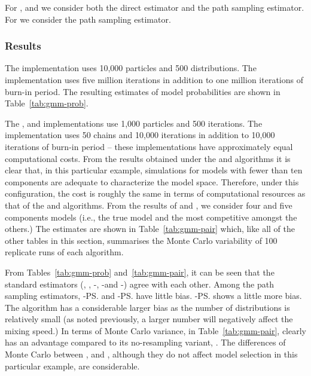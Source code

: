 For \smc[2], \smc[3] and \ais we consider both the direct estimator and the
path sampling estimator. For \pmcmc we consider the path sampling estimator.

\subsubsection{Results}
\label{sec:gmm_res}

The \smc[1] implementation uses 10,000 particles and 500 distributions. The
\rjmcmc implementation uses five million iterations in addition to one million
iterations of burn-in period. The resulting estimates of model probabilities
are shown in Table~\ref{tab:gmm-prob}.

The \smc[2], \smc[3] and \ais implementations use 1,000 particles and 500
iterations. The \pmcmc implementation uses 50 chains and 10,000 iterations in
addition to 10,000 iterations of burn-in period -- these implementations have
approximately equal computational costs. From the results obtained under the
\smc[1] and \rjmcmc algorithms it is clear that, in this particular example,
simulations for models with fewer than ten components are adequate to
characterize the model space. Therefore, under this configuration, the cost is
roughly the same in terms of computational resources as that of the \smc[1]
and \rjmcmc algorithms. From the results of \rjmcmc and \smc[1], we consider
four and five components models (i.e., the true model and the most competitive
amongst the others.) The estimates are shown in Table~\ref{tab:gmm-pair}
which, like all of the other tables in this section, summarises the Monte
Carlo variability of 100 replicate runs of each algorithm.




From Tables~\ref{tab:gmm-prob} and~\ref{tab:gmm-pair}, it can be seen that the
standard estimators (\rjmcmc, \smc[1], \smc[2]-\ds, \smc[3]-\ds and \ais-\ds)
agree with each other. Among the path sampling estimators, \smc[2]-\ps and
\ais-\ps have little bias. \smc[3]-\ps shows a little more bias. The \pmcmc
algorithm has a considerable larger bias as the number of distributions is
relatively small (as noted previously, a larger number will negatively affect
the mixing speed.) In terms of Monte Carlo variance, in
Table~\ref{tab:gmm-pair}, \smc[2] clearly has an advantage compared to its
no-resampling variant, \ais. The differences of Monte Carlo \sd between
\smc[2], \smc[3] and \pmcmc, although they do not affect model selection in
this particular example, are considerable.

